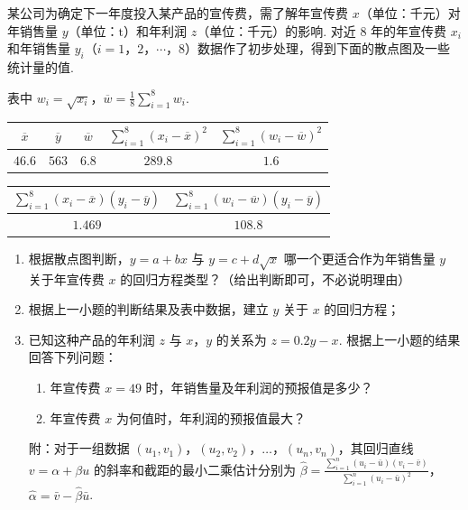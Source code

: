 \begin{problem}
某公司为确定下一年度投入某产品的宣传费，需了解年宣传费 \(x\)（单位：\(\text{千元}\)）对年销售量 \(y\)（单位：\(\mathrm{t}\)）和年利润 \(z\)（单位：\(\text{千元}\)）的影响. 对近 \(8\) 年的年宣传费 \(x_i\) 和年销售量 \(y_i\)（\(i = 1\)，\(2\)，\(\cdots\)，\(8\)）数据作了初步处理，得到下面的散点图及一些统计量的值.

表中 \(w_i = \sqrt{x_i}\)，\(\overline{w} = \frac{1}{8}\sum_{i=1}^{8}w_i\).

\begin{center}
\renewcommand{\arraystretch}{1.2}
\begin{tabular}{|c|c|c|c|c|}
\hline
\(\overline{x}\) & \(\overline{y}\) & \(\overline{w}\) & \(\displaystyle\sum_{i=1}^{8}(x_i-\overline{x})^2\) & \(\displaystyle\sum_{i=1}^{8}(w_i-\overline{w})^2\) \\
\hline
\(46.6\) & \(563\) & \(6.8\) & \(289.8\) & \(1.6\) \\
\hline
\end{tabular}

\vspace{0.4em}

\begin{tabular}{|c|c|}
\hline
\(\displaystyle\sum_{i=1}^{8}(x_i-\overline{x})(y_i-\overline{y})\) & \(\displaystyle\sum_{i=1}^{8}(w_i-\overline{w})(y_i-\overline{y})\) \\
\hline
\(1.469\) & \(108.8\) \\
\hline
\end{tabular}
\end{center}

\begin{enumerate}
\item 根据散点图判断，\(y = a + bx\) 与 \(y = c + d\sqrt{x}\) 哪一个更适合作为年销售量 \(y\) 关于年宣传费 \(x\) 的回归方程类型？（给出判断即可，不必说明理由）
\item 根据上一小题的判断结果及表中数据，建立 \(y\) 关于 \(x\) 的回归方程；
\item 已知这种产品的年利润 \(z\) 与 \(x\)，\(y\) 的关系为 \(z = 0.2y - x\). 根据上一小题的结果回答下列问题：
\begin{enumerate}
\item 年宣传费 \(x = 49\) 时，年销售量及年利润的预报值是多少？
\item 年宣传费 \(x\) 为何值时，年利润的预报值最大？
\end{enumerate}
附：对于一组数据 \((u_1,v_1)\)，\((u_2,v_2)\)，\(\dots\)，\((u_n,v_n)\)，其回归直线 \(v = \alpha + \beta u\) 的斜率和截距的最小二乘估计分别为 \(\hat{\beta} = \frac{\sum_{i=1}^{n}(u_i-\bar{u})(v_i-\bar{v})}{\sum_{i=1}^{n}(u_i-\bar{u})^2}\)，\(\hat{\alpha} = \bar{v} - \hat{\beta}\bar{u}\).
\end{enumerate}

\end{problem}

